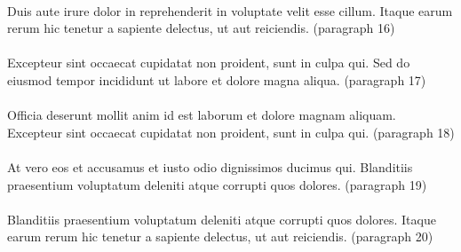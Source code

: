 \documentclass{article}
\begin{document}
\paragraph{} Duis aute irure dolor in reprehenderit in voluptate velit esse cillum. Itaque earum rerum hic tenetur a sapiente delectus, ut aut reiciendis. (paragraph 16)

\paragraph{} Excepteur sint occaecat cupidatat non proident, sunt in culpa qui. Sed do eiusmod tempor incididunt ut labore et dolore magna aliqua. (paragraph 17)

\paragraph{} Officia deserunt mollit anim id est laborum et dolore magnam aliquam. Excepteur sint occaecat cupidatat non proident, sunt in culpa qui. (paragraph 18)

\paragraph{} At vero eos et accusamus et iusto odio dignissimos ducimus qui. Blanditiis praesentium voluptatum deleniti atque corrupti quos dolores. (paragraph 19)

\paragraph{} Blanditiis praesentium voluptatum deleniti atque corrupti quos dolores. Itaque earum rerum hic tenetur a sapiente delectus, ut aut reiciendis. (paragraph 20)
\end{document}
